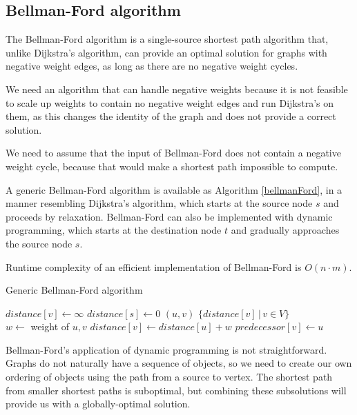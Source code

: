 \documentclass{article}
\begin{document}
\subsection{Bellman-Ford algorithm}
The Bellman-Ford algorithm is a single-source shortest path algorithm that, unlike Dijkstra's algorithm, can provide an optimal solution for graphs with negative weight edges, as long as there are no negative weight cycles.

We need an algorithm that can handle negative weights because it is not feasible to scale up weights to contain no negative weight edges and run Dijkstra's on them, as this changes the identity of the graph and does not provide a correct solution.

We need to assume that the input of Bellman-Ford does not contain a negative weight cycle, because that would make a shortest path impossible to compute.

A generic Bellman-Ford algorithm is available as Algorithm \ref{bellmanFord}, in a manner resembling Dijkstra's algorithm, which starts at the source node $s$ and proceeds by relaxation. Bellman-Ford can also be implemented with dynamic programming, which starts at the destination node $t$ and gradually approaches the source node $s$.

Runtime complexity of an efficient implementation of Bellman-Ford is $O(n \cdot m)$.

\begin{algorithm}
\caption{Generic Bellman-Ford algorithm}\label{bellmanFord}
\begin{algorithmic}[1]
    \State $distance[v] \gets \infty$
\EndFor
\State $distance[s] \gets 0$
        $(u, v)$
    \EndFor
\EndFor
\State \Return $\{distance[v] \, | \, v \in V\}$
\EndProcedure\\
\State $w \gets$ weight of $u, v$
    \State $distance[v] \gets distance[u] + w$
    \State $predecessor[v] \gets u$
\EndIf
\EndProcedure
\end{algorithmic}
\end{algorithm}

Bellman-Ford's application of dynamic programming is not straightforward. Graphs do not naturally have a sequence of objects, so we need to create our own ordering of objects using the path from a source to vertex. The shortest path from smaller shortest paths is suboptimal, but combining these subsolutions will provide us with a globally-optimal solution.
\end{document}

